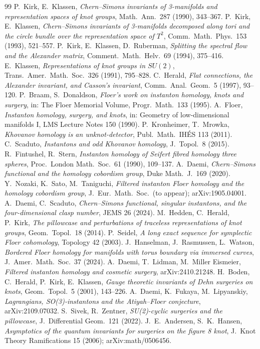 \begin{thebibliography}{99}\small
{} P.~Kirk, E.~Klassen, \emph{Chern--Simons invariants of 3-manifolds and representation spaces of knot groups}, Math.\ Ann.\ 287 (1990), 343--367.
 P.~Kirk, E.~Klassen, \emph{Chern--Simons invariants of 3-manifolds decomposed along tori and the circle bundle over the representation space of $T^2$}, Comm.\ Math.\ Phys.\ 153 (1993), 521--557.
 P.~Kirk, E.~Klassen, D.~Ruberman, \emph{Splitting the spectral flow and the Alexander matrix}, Comment.\ Math.\ Helv.\ 69 (1994), 375--416.
 E.~Klassen, \emph{Representations of knot groups in $SU(2)$}, Trans.\ Amer.\ Math.\ Soc.\ 326 (1991), 795--828.
 C.~Herald, \emph{Flat connections, the Alexander invariant, and Casson's invariant}, Comm.\ Anal.\ Geom.\ 5 (1997), 93--120.
 P.~Braam, S.~Donaldson, \emph{Floer's work on instanton homology, knots and surgery}, in: The Floer Memorial Volume, Progr.\ Math.\ 133 (1995).
 A.~Floer, \emph{Instanton homology, surgery, and knots}, in: Geometry of low-dimensional manifolds I, LMS Lecture Notes 150 (1990).
 P.~Kronheimer, T.~Mrowka, \emph{Khovanov homology is an unknot-detector}, Publ.\ Math.\ IH\'ES 113 (2011).
 C.~Scaduto, \emph{Instantons and odd Khovanov homology}, J.\ Topol.\ 8 (2015).
 R.~Fintushel, R.~Stern, \emph{Instanton homology of Seifert fibred homology three spheres}, Proc.\ London Math.\ Soc.\ 61 (1990), 109--137.
 A.~Daemi, \emph{Chern--Simons functional and the homology cobordism group}, Duke Math.\ J.\ 169 (2020).
 Y.~Nozaki, K.~Sato, M.~Taniguchi, \emph{Filtered instanton Floer homology and the homology cobordism group}, J.\ Eur.\ Math.\ Soc.\ (to appear); arXiv:1905.04001.
 A.~Daemi, C.~Scaduto, \emph{Chern--Simons functional, singular instantons, and the four-dimensional clasp number}, JEMS 26 (2024).
 M.~Hedden, C.~Herald, P.~Kirk, \emph{The pillowcase and perturbations of traceless representations of knot groups}, Geom.\ Topol.\ 18 (2014).
 P.~Seidel, \emph{A long exact sequence for symplectic Floer cohomology}, Topology 42 (2003).
 J.~Hanselman, J.~Rasmussen, L.~Watson, \emph{Bordered Floer homology for manifolds with torus boundary via immersed curves}, J.\ Amer.\ Math.\ Soc.\ 37 (2024).
 A.~Daemi, T.~Lidman, M.~Miller Eismeier, \emph{Filtered instanton homology and cosmetic surgery}, arXiv:2410.21248.
 H.~Boden, C.~Herald, P.~Kirk, E.~Klassen, \emph{Gauge theoretic invariants of Dehn surgeries on knots}, Geom.\ Topol.\ 5 (2001), 143--226.
 A.~Daemi, K.~Fukaya, M.~Lipyanskiy, \emph{Lagrangians, SO(3)-instantons and the Atiyah--Floer conjecture}, arXiv:2109.07032.
 S.~Sivek, R.~Zentner, \emph{SU(2)-cyclic surgeries and the pillowcase}, J.\ Differential Geom.\ 121 (2022).
 J.~E.~Andersen, S.~K.~Hansen, \emph{Asymptotics of the quantum invariants for surgeries on the figure 8 knot}, J.\ Knot Theory Ramifications 15 (2006); arXiv:math/0506456.
\end{thebibliography}
